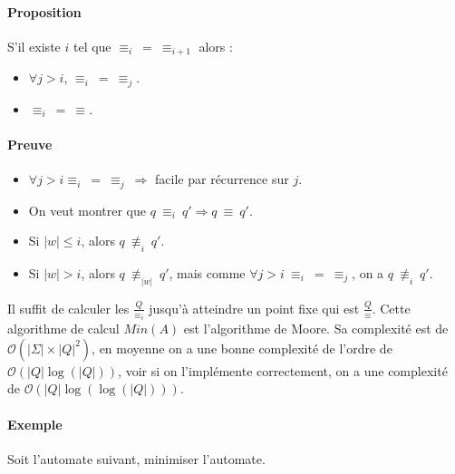 

\paragraph{Proposition} %
\label{par:proposition}

S'il existe $i$ tel que $\equiv_i\ =\ \equiv_{i+1}$ alors :
\begin{itemize}
	\item $\forall j > i$, $\equiv_i\ =\ \equiv_j$.
	\item $\equiv_i\ =\ \equiv$.
\end{itemize}



\paragraph{Preuve} %
\label{par:preuve}

\begin{itemize}
	\item $\forall j > i \equiv_i\ =\ \equiv_j\ \Rightarrow$ facile par récurrence sur $j$.
	\item On veut montrer que $q\ \equiv_i\ q' \Rightarrow q\ \equiv\ q'$.
	\item Si $\left|w\right| \leq i$, alors $q\ \not \equiv_i \ q'$.
	\item Si $\left|w\right| > i$, alors $q\ \not \equiv_{\left|w\right|} \ q'$, mais comme $\forall j > i\ \equiv_i\ =\ \equiv_j$, on a $q\ \not \equiv_i\ q'$.
\end{itemize}


Il suffit de calculer les $\frac{Q}{\equiv_i}$ jusqu'à atteindre un point fixe qui est $\frac{Q}{\equiv}$. Cette algorithme de calcul $Min(A)$ est l'algorithme de Moore. Sa complexité est de $\mathcal{O}(\left|\Sigma\right| \times \left|Q\right|^2)$, en moyenne on a une bonne complexité de l'ordre de $\mathcal{O}(\left|Q\right|\log({\left|Q\right|}))$, voir si on l'implémente correctement, on a une complexité de $\mathcal{O}(\left|Q\right|\log( \log({\left|Q\right|}) ))$.


\paragraph{Exemple} %
\label{par:exemple}
	Soit l'automate suivant, minimiser l'automate.


